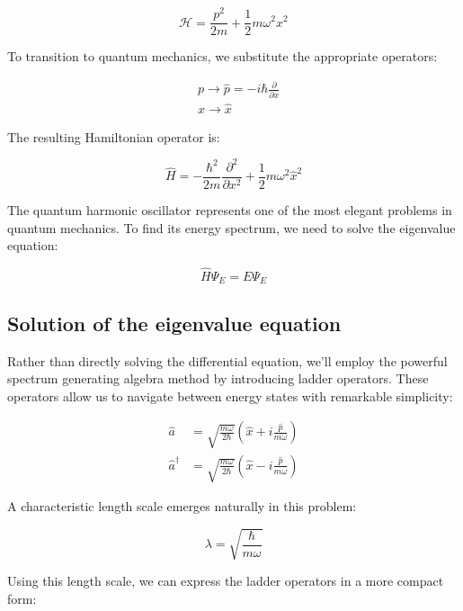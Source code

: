 \documentclass[italian]{HKNdocument}
\begin{document}
\begin{equation}
\mathcal{H} = \frac{p^2}{2m} + \frac{1}{2}m\omega^2 x^2
\end{equation}

To transition to quantum mechanics, we substitute the appropriate operators:

\begin{align}
&p \longrightarrow \hat{p} = -i\hbar\frac{\partial}{\partial x}  \\
&x \longrightarrow \hat{x}
\end{align}

The resulting Hamiltonian operator is:


\begin{equation}
\hat{H} = -\frac{\hbar^2}{2m}\frac{\partial^2}{\partial x^2} + \frac{1}{2}m\omega^2\hat{x}^2
\end{equation}

The quantum harmonic oscillator represents one of the most elegant problems in quantum mechanics. To find its energy spectrum, we need to solve the eigenvalue equation:

\begin{equation}
\hat{H}\Psi_E = E\Psi_E
\end{equation}

\subsection{Solution of the eigenvalue equation}

Rather than directly solving the differential equation, we'll employ the powerful spectrum generating algebra method by introducing ladder operators. These operators allow us to navigate between energy states with remarkable simplicity:

\begin{align}
\hat{a} &= \sqrt{\frac{m\omega}{2\hbar}}\left(\hat{x} + i\frac{\hat{p}}{m\omega}\right)  \\
\hat{a}^\dagger &= \sqrt{\frac{m\omega}{2\hbar}}\left(\hat{x} - i\frac{\hat{p}}{m\omega}\right)
\end{align}

A characteristic length scale emerges naturally in this problem:

\begin{equation}
\lambda = \sqrt{\frac{\hbar}{m\omega}}
\end{equation}

Using this length scale, we can express the ladder operators in a more compact form:
\end{document}
